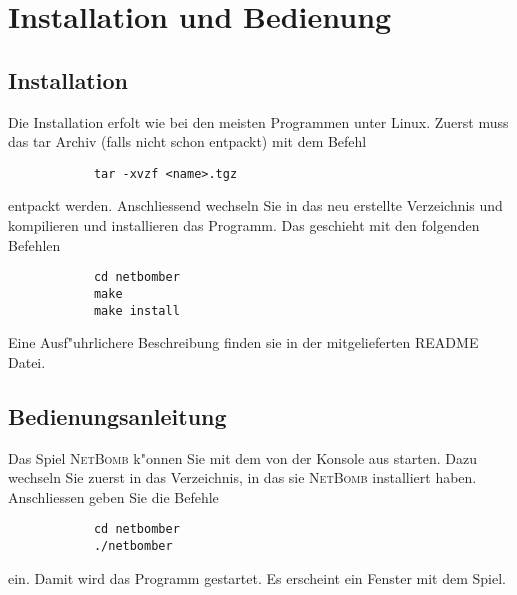 \chapter{Installation und Bedienung}
	\section{Installation}	
		Die Installation erfolt wie bei den meisten Programmen unter Linux. Zuerst muss das tar Archiv (falls nicht schon entpackt)
		mit dem Befehl
		\begin{verbatim}
			tar -xvzf <name>.tgz
		\end{verbatim}
		entpackt werden. Anschliessend wechseln Sie in das neu erstellte Verzeichnis und kompilieren und installieren das Programm.
		Das geschieht mit den folgenden Befehlen
		\begin{verbatim}
			cd netbomber
			make
			make install
		\end{verbatim}

		Eine Ausf"uhrlichere Beschreibung finden sie in der mitgelieferten README Datei.

	\section{Bedienungsanleitung}
		Das Spiel \textsc{NetBomb} k"onnen Sie mit dem von der Konsole aus starten. Dazu wechseln Sie zuerst in das Verzeichnis,
		in das sie \textsc{NetBomb} installiert haben. Anschliessen geben Sie die Befehle
		\begin{verbatim}
			cd netbomber
			./netbomber
		\end{verbatim}
		ein. Damit wird das Programm gestartet. Es erscheint ein Fenster mit dem Spiel. 

